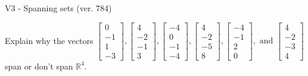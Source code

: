 \begin{exercise}
  \begin{exerciseTitle}V3 - Spanning sets (ver. 784)\end{exerciseTitle}
  \begin{exerciseStatement}
    Explain why the vectors \(\left[\begin{array}{r}
0 \\
-1 \\
1 \\
-3
\end{array}\right] , \left[\begin{array}{r}
4 \\
-2 \\
-1 \\
3
\end{array}\right] , \left[\begin{array}{r}
-4 \\
0 \\
-1 \\
-4
\end{array}\right] , \left[\begin{array}{r}
4 \\
-2 \\
-5 \\
8
\end{array}\right] , \left[\begin{array}{r}
-4 \\
-1 \\
2 \\
0
\end{array}\right] , \text{ and } \left[\begin{array}{r}
4 \\
-2 \\
-3 \\
4
\end{array}\right]\) span or don't span \(\mathbb{R}^4\). 
	



\end{exerciseStatement}
\end{exercise}
